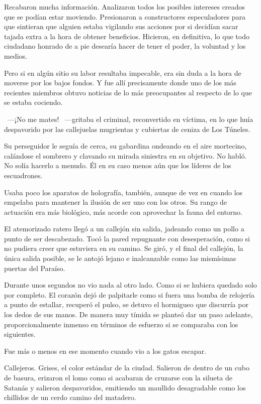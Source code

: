 Recabaron mucha información. Analizaron todos los posibles intereses creados que se podían estar moviendo. Presionaron a constructores especuladores para que sintieran que alguien estaba vigilando sus acciones por si decidían sacar tajada extra a la hora de obtener beneficios. Hicieron, en definitiva, lo que todo ciudadano honrado de a pie desearía hacer de tener el poder, la voluntad y los medios.

Pero si en algún sitio su labor resultaba impecable, era sin duda a la hora de moverse por los bajos fondos. Y fue allí precisamente donde uno de los más recientes miembros obtuvo noticias de lo más preocupantes al respecto de lo que se estaba cociendo.

~---¡No me mates! ~---gritaba el criminal, reconvertido en víctima, en lo que huía despavorido por las callejuelas mugrientas y cubiertas de ceniza de Los Túneles.

Su perseguidor le seguía de cerca, su gabardina ondeando en el aire mortecino, calándose el sombrero y clavando su mirada siniestra en su objetivo. No habló. No solía hacerlo a menudo. Él en su caso menos aún que los líderes de los escuadrones.

Usaba poco los aparatos de holografía, también, aunque de vez en cuando los empelaba para mantener la ilusión de ser uno con los otros. Su rango de actuación era más biológico, más acorde con aprovechar la fauna del entorno.

El atemorizado ratero llegó a un callejón sin salida, jadeando como un pollo a punto de ser descabezado. Tocó la pared repugnante con desesperación, como si no pudiera creer que estuviera en su camino. Se giró, y el final del callejón, la única salida posible, se le antojó lejano e inalcanzable como las mismísimas puertas del Paraíso.

Durante unos segundos no vio nada al otro lado. Como si se hubiera quedado solo por completo. El corazón dejó de palpitarle como si fuera una bomba de relojería a punto de estallar, recuperó el pulso, se detuvo el hormigueo que discurría por los dedos de sus manos. De manera muy tímida se planteó dar un paso adelante, proporcionalmente inmenso en términos de esfuerzo si se comparaba con los siguientes.

Fue más o menos en ese momento cuando vio a los gatos escapar.

Callejeros. Grises, el color estándar de la ciudad. Salieron de dentro de un cubo de basura, erizaron el lomo como si acabaran de cruzarse con la silueta de Satanás y salieron despavoridos, emitiendo un maullido desagradable como los chillidos de un cerdo camino del matadero.

